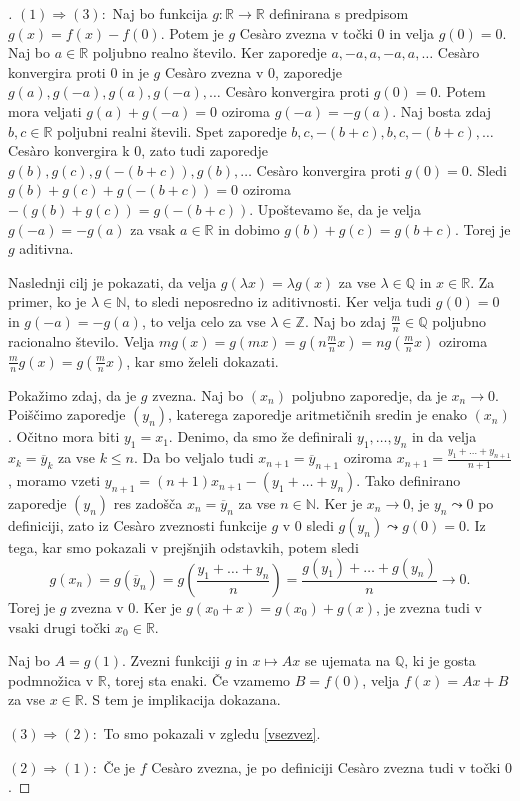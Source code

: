 \documentclass[a4paper,12pt]{article}
\theoremstyle{definition}
\theoremstyle{plain}
\newenvironment{dokaz}{\begin{proof}[\bfseries\upshape\proofname]}{\end{proof}}
\begin{document}
\begin{dokaz}
    $(1) \Rightarrow (3): $ Naj bo funkcija $g: \mathbb{R} \rightarrow \mathbb{R}$ definirana s predpisom $g(x) = f(x) - f(0)$. Potem je $g$ Ces\`{a}ro zvezna v točki $0$ in velja $g(0) = 0$. 
    Naj bo $a \in \mathbb{R}$ poljubno realno število. Ker zaporedje $a, -a, a, -a, a, \ldots$ Ces\`{a}ro konvergira proti $0$ in je $g$ Ces\`{a}ro zvezna v $0$, zaporedje $g(a), g(-a), g(a), g(-a), \ldots$ Ces\`{a}ro konvergira proti $g(0) = 0$. Potem mora veljati $g(a) + g(-a) = 0$ oziroma $g(-a) = -g(a)$. 
    Naj bosta zdaj $b, c \in \mathbb{R}$ poljubni realni števili. Spet zaporedje $b, c, -(b+c), b, c, -(b+c), \ldots$ Ces\`{a}ro konvergira k $0$, zato tudi zaporedje $g(b), g(c), g(-(b+c)), g(b), \ldots$ Ces\`{a}ro konvergira proti $g(0) = 0$. Sledi $g(b) + g(c) + g(-(b+c)) = 0$ oziroma $-(g(b) + g(c)) = g(-(b+c))$. Upoštevamo še, da je velja $g(-a) = -g(a)$ za vsak $a \in \mathbb{R}$ in dobimo $g(b) + g(c) = g(b+c)$. Torej je $g$ aditivna.

    Naslednji cilj je pokazati, da velja $g(\lambda x) = \lambda g(x)$ za vse $\lambda \in \mathbb{Q}$ in $x \in \mathbb{R}$. Za primer, ko je $\lambda \in \mathbb{N}$, to sledi neposredno iz aditivnosti. Ker velja tudi $g(0) = 0$ in $g(-a) = -g(a)$, to velja celo za vse $\lambda \in \mathbb{Z}$. Naj bo zdaj $\frac{m}{n} \in \mathbb{Q}$ poljubno racionalno število. Velja $mg(x) = g(mx) = g(n\frac{m}{n}x) = ng(\frac{m}{n}x)$ oziroma $\frac{m}{n}g(x) = g(\frac{m}{n}x)$, kar smo želeli dokazati.

    Pokažimo zdaj, da je $g$ zvezna. Naj bo $(x_n)$ poljubno zaporedje, da je $x_n \rightarrow 0$. Poiščimo zaporedje $(y_n)$, katerega zaporedje aritmetičnih sredin je enako $(x_n)$. Očitno mora biti $y_1 = x_1$. Denimo, da smo že definirali $y_1, \ldots, y_n$ in da velja $x_k = \overline{y}_k$ za vse $k \leq n$. Da bo veljalo tudi $x_{n+1} = \overline{y}_{n+1}$ oziroma $x_{n+1} = \frac{y_1 + \ldots + y_{n+1}}{n+1}$, moramo vzeti $y_{n+1} = (n+1)x_{n+1} - (y_1 + \ldots + y_n)$. Tako definirano zaporedje $(y_n)$ res zadošča $x_n = \overline{y}_n$ za vse $n \in \mathbb{N}$. Ker je $x_n \rightarrow 0$, je $y_n \leadsto 0$ po definiciji, zato iz Ces\`{a}ro zveznosti funkcije $g$ v $0$ sledi $g(y_n) \leadsto g(0) = 0$. Iz tega, kar smo pokazali v prejšnjih odstavkih, potem sledi 
    $$g(x_n) = g(\overline{y}_n) = g(\frac{y_1 + \ldots + y_n}{n}) = \frac{g(y_1) + \ldots + g(y_n)}{n} \rightarrow 0.$$
    Torej je $g$ zvezna v $0$. Ker je $g(x_0 + x) = g(x_0) + g(x)$, je zvezna tudi v vsaki drugi točki $x_0 \in \mathbb{R}$.

    Naj bo $A = g(1)$. Zvezni funkciji $g$ in $x \mapsto Ax$ se ujemata na $\mathbb{Q}$, ki je gosta podmnožica v $\mathbb{R}$, torej sta enaki. Če vzamemo $B = f(0)$, velja $f(x) = Ax + B$ za vse $x \in \mathbb{R}$. S tem je implikacija dokazana.

    $(3) \Rightarrow (2): $ To smo pokazali v zgledu \ref{vsezvez}.

    $(2) \Rightarrow (1): $ Če je $f$ Ces\`{a}ro zvezna, je po definiciji Ces\`{a}ro zvezna tudi v točki $0$.
\end{dokaz}
\end{document}
